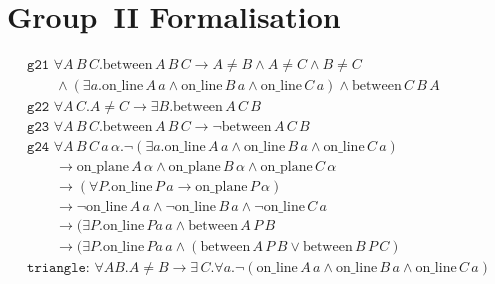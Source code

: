 \documentclass{article}
\newcommand{\online}[2]{\text{on\_line}\,#1\,#2}
\newcommand{\onplane}[2]{\text{on\_plane}\,#1\,#2}
\newcommand{\between}[3]{\text{between}\,#1\,#2\,#3}
\newcommand{\Triangle}[4]{\forall #1.\neg(\online{#2}{a}\wedge \online{#3}{a}\wedge \online{#4}{a})}
\renewcommand{\implies}{\longrightarrow}
\begin{document}
\section{Group~II Formalisation}\label{app:GroupIIFormalisation}
\begin{align*}
&\texttt{g21 }\forall A\,B\,C. \between{A}{B}{C} \implies A\neq B\wedge A\neq C\wedge B\neq C\\
&\qquad\wedge (\exists a. \online{A}{a}\wedge\online{B}{a}\wedge\online{C}{a})\wedge\between{C}{B}{A}\\
&\texttt{g22 }\forall A\,C. A\neq C \implies \exists B. \between{A}{C}{B}\\
&\texttt{g23 }\forall A\,B\,C. \between{A}{B}{C} \implies \neg\between{A}{C}{B}\\
&\texttt{g24 }\forall A\,B\,C\,a\,\alpha. \neg(\exists a.\online{A}{a}\wedge\online{B}{a}\wedge\online{C}{a})\\
&\qquad\implies\onplane{A}{\alpha}\wedge\onplane{B}{\alpha}\wedge\onplane{C}{\alpha}\\
&\qquad\implies(\forall P. \online{P}{a}\implies\onplane{P}{\alpha})\\
&\qquad\implies\neg\online{A}{a}\wedge\neg\online{B}{a}\wedge\neg\online{C}{a}\\
&\qquad\implies(\exists P. \online{Pa}{a} \wedge \between{A}{P}{B}\\
&\qquad\implies(\exists P. \online{Pa}{a} \wedge (\between{A}{P}{B} \vee \between{B}{P}{C})
&\\
&\texttt{triangle: }\forall A B. A \neq B \implies \exists\,C. \Triangle{a}{A}{B}{C}
\end{align*}
\end{document}
